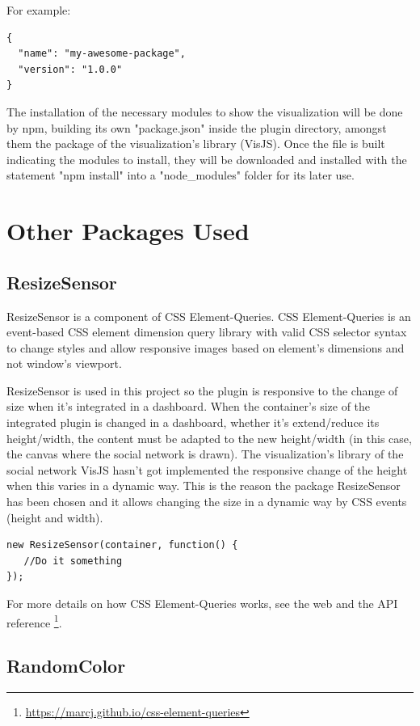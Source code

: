 \documentclass[a4paper, 12pt]{book}
\begin{document}
For example:
\begin{lstlisting}[frame=single]
{
  "name": "my-awesome-package",
  "version": "1.0.0"
}
\end{lstlisting}

The installation of the necessary modules to show the visualization will be done by npm, building its own "package.json" inside the plugin directory, amongst them the package of the visualization’s library (VisJS).  Once the file is built indicating the modules to install, they will be downloaded and installed with the statement "npm install" into a "node\_modules" folder for its later use.

\section{Other Packages Used}
\label{sec:otherspackage}
\subsection{ResizeSensor}
ResizeSensor is a component of CSS Element-Queries. CSS Element-Queries is an event-based CSS element dimension query library with valid CSS selector syntax to change styles and allow responsive images based on element's dimensions and not window's viewport.

ResizeSensor is used in this project so the plugin is responsive to the change of size when it’s integrated in a dashboard. When the container’s size of the integrated plugin is changed in a dashboard, whether it’s extend/reduce its height/width, the content must be adapted to the new height/width (in this case, the canvas where the social network is drawn). The visualization’s library of the social network VisJS hasn’t got implemented the responsive change of the height when this varies in a dynamic way. This is the reason the package ResizeSensor has been chosen and it allows changing the size in a dynamic way by CSS events (height and width).

\begin{lstlisting}[frame=single]
new ResizeSensor(container, function() {
   //Do it something
});
\end{lstlisting}

For more details on how CSS Element-Queries works, see the web and the API reference \footnote{\url{https://marcj.github.io/css-element-queries}}.

\subsection{RandomColor}
\end{document}
